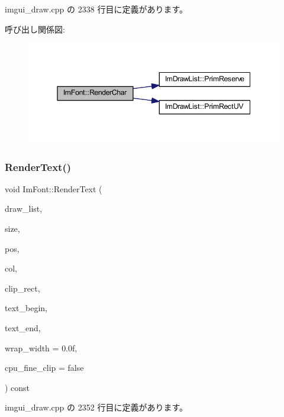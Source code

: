  imgui\+\_\+draw.\+cpp の 2338 行目に定義があります。

呼び出し関係図\+:\nopagebreak
\begin{figure}[H]
\begin{center}
\leavevmode
\includegraphics[width=345pt]{struct_im_font_af602fe8f445ae4142436ee3e6baa3ede_cgraph}
\end{center}
\end{figure}
\mbox{\label{struct_im_font_a2877acf1cfcd964bc2e7fe600a08849e}} 
\subsubsection{\texorpdfstring{Render\+Text()}{RenderText()}}
{\footnotesize\ttfamily void Im\+Font\+::\+Render\+Text (\begin{DoxyParamCaption}\item[{\mbox{\hyperlink{struct_im_draw_list}{Im\+Draw\+List}} $\ast$}]{draw\+\_\+list,  }\item[{float}]{size,  }\item[{\mbox{\hyperlink{struct_im_vec2}{Im\+Vec2}}}]{pos,  }\item[{\mbox{\hyperlink{imgui_8h_a118cff4eeb8d00e7d07ce3d6460eed36}{Im\+U32}}}]{col,  }\item[{const \mbox{\hyperlink{struct_im_vec4}{Im\+Vec4}} \&}]{clip\+\_\+rect,  }\item[{const char $\ast$}]{text\+\_\+begin,  }\item[{const char $\ast$}]{text\+\_\+end,  }\item[{float}]{wrap\+\_\+width = {\ttfamily 0.0f},  }\item[{bool}]{cpu\+\_\+fine\+\_\+clip = {\ttfamily false} }\end{DoxyParamCaption}) const}



 imgui\+\_\+draw.\+cpp の 2352 行目に定義があります。

